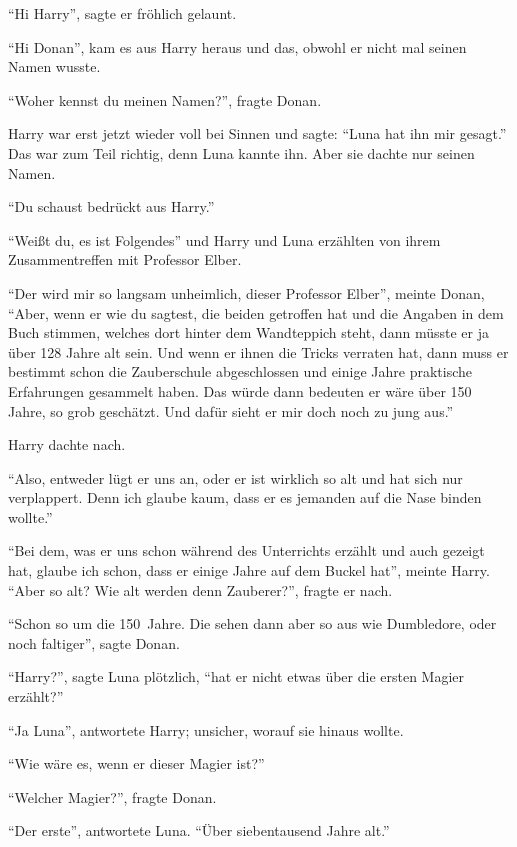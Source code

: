 \enquote{Hi Harry}, sagte er fröhlich gelaunt.

\enquote{Hi Donan}, kam es aus Harry heraus und das, obwohl er nicht mal seinen Namen wusste.

\enquote{Woher kennst du meinen Namen?}, fragte Donan.

Harry war erst jetzt wieder voll bei Sinnen und sagte: \enquote{Luna hat ihn mir gesagt.} Das war zum Teil richtig, denn Luna kannte ihn. Aber sie dachte nur seinen Namen.

\enquote{Du schaust bedrückt aus Harry.}

\enquote{Weißt du, es ist Folgendes\abs} und Harry und Luna erzählten von ihrem Zusammentreffen mit Professor Elber.

\enquote{Der wird mir so langsam unheimlich, dieser Professor Elber}, meinte Donan, \enquote{Aber, wenn er wie du sagtest, die beiden getroffen hat und die Angaben in dem Buch stimmen, welches dort hinter dem Wandteppich steht, dann müsste er ja über 128 Jahre alt sein. Und wenn er ihnen die Tricks verraten hat, dann muss er bestimmt schon die Zauberschule abgeschlossen und einige Jahre praktische Erfahrungen gesammelt haben. Das würde dann bedeuten er wäre über 150 Jahre, so grob geschätzt. Und dafür sieht er mir doch noch zu jung aus.}

Harry dachte nach.

\enquote{Also, entweder lügt er uns an, oder er ist wirklich so alt und hat sich nur verplappert. Denn ich glaube kaum, dass er es jemanden auf die Nase binden wollte.}

\enquote{Bei dem, was er uns schon während des Unterrichts erzählt und auch gezeigt hat, glaube ich schon, dass er einige Jahre auf dem Buckel hat}, meinte Harry. \enquote{Aber so alt? Wie alt werden denn Zauberer?}, fragte er nach.

\enquote{Schon so um die 150~Jahre. Die sehen dann aber so aus wie Dumbledore, oder noch faltiger}, sagte Donan.

\enquote{Harry?}, sagte Luna plötzlich, \enquote{hat er nicht etwas über die ersten Magier erzählt?}

\enquote{Ja Luna}, antwortete Harry; unsicher, worauf sie hinaus wollte.

\enquote{Wie wäre es, wenn er dieser Magier ist?}

\enquote{Welcher Magier?}, fragte Donan.

\enquote{Der erste}, antwortete Luna. \enquote{Über siebentausend Jahre alt.}

